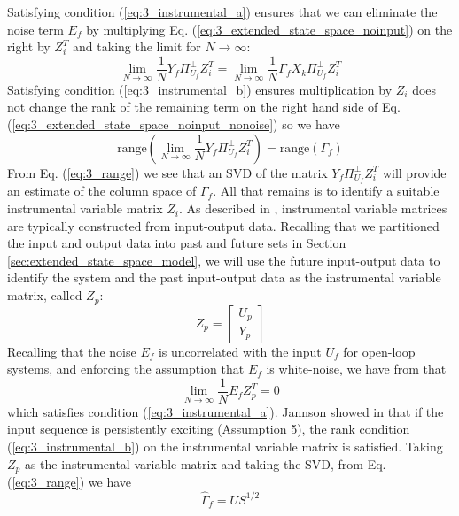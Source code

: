 Satisfying condition (\ref{eq:3_instrumental_a}) ensures that we can eliminate the noise term $E_f$ by multiplying Eq. (\ref{eq:3_extended_state_space_noinput}) on the right by $Z_i^T$ and taking the limit for $N\rightarrow\infty$:
\begin{equation}\label{eq:3_extended_state_space_noinput_nonoise}
\lim_{N\rightarrow\infty} \frac{1}{N}Y_f\Pi_{U_f}^\perp Z_i^T = \lim_{N\rightarrow\infty} \frac{1}{N}\Gamma_f X_k\Pi_{U_f}^\perp Z_i^T
\end{equation}
 Satisfying condition (\ref{eq:3_instrumental_b}) ensures multiplication by $Z_i$ does not change the rank of the remaining term on the right hand side of Eq. (\ref{eq:3_extended_state_space_noinput_nonoise}) so we have
\begin{equation}\label{eq:3_range}
\mbox{range}\left(\lim_{N\rightarrow\infty} \frac{1}{N} Y_f\Pi_{U_f}^\perp Z_i^T\right) = \mbox{range}\left(\Gamma_f\right)
\end{equation}
From Eq. (\ref{eq:3_range}) we see that an SVD of the matrix $Y_f\Pi_{U_f}^\perp Z_i^T$  will provide an estimate of the column space of $\Gamma_f$. All that remains is to identify a suitable instrumental variable matrix $Z_i$. As described in \cite{soderstrom1983instrumental, verhaegen2007filtering}, instrumental variable matrices are typically constructed from input-output data. Recalling that we partitioned the input and output data into past and future sets in Section \ref{sec:extended_state_space_model}, we will use the future input-output data to identify the system and the past input-output data as the instrumental variable matrix, called $Z_p$:
\begin{equation*}
Z_p = \begin{bmatrix}U_p\\ Y_p\end{bmatrix}
\end{equation*}
Recalling that the noise $E_f$ is uncorrelated with the input $U_f$ for open-loop systems, and enforcing the assumption that $E_f$ is white-noise, we have from \cite{verhaegen2007filtering} that 
\begin{equation*}
\lim_{N\rightarrow\infty} \frac{1}{N} E_f Z_p^T = 0
\end{equation*}
which satisfies condition (\ref{eq:3_instrumental_a}). Jannson showed in \cite{jansson1997subspace} that if the input sequence is persistently exciting (Assumption 5), the rank condition (\ref{eq:3_instrumental_b}) on the instrumental variable matrix is satisfied. Taking $Z_p$ as the instrumental variable matrix and taking the SVD, from Eq. (\ref{eq:3_range}) we have
\begin{equation}
\hat{\Gamma}_f = U {S}^{1/2}
\end{equation}


